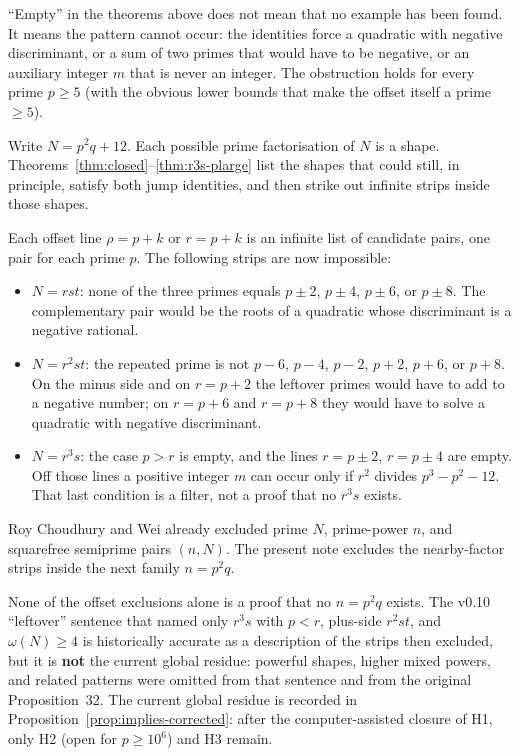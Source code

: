 \documentclass[11pt,reqno]{amsart}
\theoremstyle{definition}
\begin{document}
``Empty'' in the theorems above does not mean that no example has been found.
It means the pattern cannot occur: the identities force a quadratic with negative discriminant,
or a sum of two primes that would have to be negative, or an auxiliary integer \(m\) that is never an integer.
The obstruction holds for every prime \(p\ge 5\) (with the obvious lower bounds that make the offset itself a prime \(\ge 5\)).

Write \(N=p^2q+12\). Each possible prime factorisation of \(N\) is a shape.
Theorems~\ref{thm:closed}--\ref{thm:r3s-plarge} list the shapes that could still, in principle, satisfy both jump identities,
and then strike out infinite strips inside those shapes.

Each offset line \(\rho=p+k\) or \(r=p+k\) is an infinite list of candidate pairs, one pair for each prime \(p\).
The following strips are now impossible:
\begin{itemize}
\item \(N=rst\): none of the three primes equals \(p\pm 2\), \(p\pm 4\), \(p\pm 6\), or \(p\pm 8\).
The complementary pair would be the roots of a quadratic whose discriminant is a negative rational.
\item \(N=r^2st\): the repeated prime is not \(p-6\), \(p-4\), \(p-2\), \(p+2\), \(p+6\), or \(p+8\).
On the minus side and on \(r=p+2\) the leftover primes would have to add to a negative number;
on \(r=p+6\) and \(r=p+8\) they would have to solve a quadratic with negative discriminant.
\item \(N=r^3s\): the case \(p>r\) is empty, and the lines \(r=p\pm 2\), \(r=p\pm 4\) are empty.
Off those lines a positive integer \(m\) can occur only if \(r^2\) divides \(p^3-p^2-12\).
That last condition is a filter, not a proof that no \(r^3s\) exists.
\end{itemize}
Roy Choudhury and Wei already excluded prime \(N\), prime-power \(n\), and squarefree semiprime pairs \((n,N)\).
The present note excludes the nearby-factor strips inside the next family \(n=p^2q\).

None of the offset exclusions alone is a proof that no \(n=p^2q\) exists.
The v0.10 ``leftover'' sentence that named only \(r^3s\) with \(p<r\), plus-side \(r^2st\), and \(\omega(N)\ge 4\) is historically accurate as a description of the strips then excluded, but it is \textbf{not} the current global residue: powerful shapes, higher mixed powers, and related patterns were omitted from that sentence and from the original Proposition~32. The current global residue is recorded in Proposition~\ref{prop:implies-corrected}: after the computer-assisted closure of H1, only H2 (open for \(p\ge 10^6\)) and H3 remain.
\end{document}

